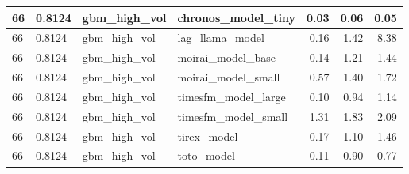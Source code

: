 {\begin{tabular}{llllrrr}
\midrule
66 & 0.8124 & gbm\_high\_vol & chronos\_model\_tiny & 0.03 & 0.06 & 0.05 \\
\midrule
66 & 0.8124 & gbm\_high\_vol & lag\_llama\_model & 0.16 & 1.42 & 8.38 \\
\midrule
66 & 0.8124 & gbm\_high\_vol & moirai\_model\_base & 0.14 & 1.21 & 1.44 \\
\midrule
66 & 0.8124 & gbm\_high\_vol & moirai\_model\_small & 0.57 & 1.40 & 1.72 \\
\midrule
66 & 0.8124 & gbm\_high\_vol & timesfm\_model\_large & 0.10 & 0.94 & 1.14 \\
\midrule
66 & 0.8124 & gbm\_high\_vol & timesfm\_model\_small & 1.31 & 1.83 & 2.09 \\
\midrule
66 & 0.8124 & gbm\_high\_vol & tirex\_model & 0.17 & 1.10 & 1.46 \\
\midrule
66 & 0.8124 & gbm\_high\_vol & toto\_model & 0.11 & 0.90 & 0.77 \\
\bottomrule
\end{tabular}
}